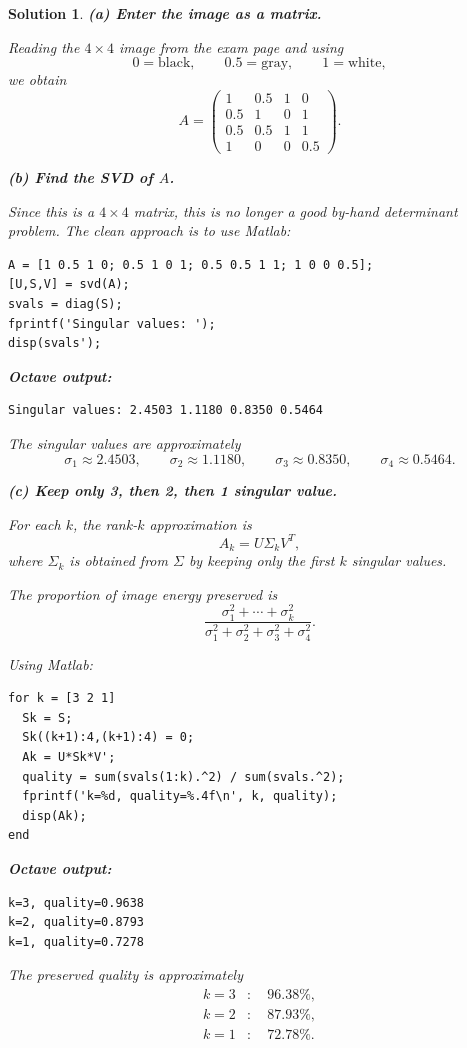 \documentclass[11pt,a4paper]{article}
\theoremstyle{sol}
\newtheorem*{solution}{Solution}
\begin{document}
\begin{solution}
\textbf{(a) Enter the image as a matrix.}

Reading the $4\times4$ image from the exam page and using
\[
0=\text{black},\qquad 0.5=\text{gray},\qquad 1=\text{white},
\]
we obtain
\[
A=
\begin{pmatrix}
1&0.5&1&0\\
0.5&1&0&1\\
0.5&0.5&1&1\\
1&0&0&0.5
\end{pmatrix}.
\]

\textbf{(b) Find the SVD of $A$.}

Since this is a $4\times4$ matrix, this is no longer a good by-hand determinant problem. The clean approach is to use Matlab:
\begin{lstlisting}
A = [1 0.5 1 0; 0.5 1 0 1; 0.5 0.5 1 1; 1 0 0 0.5];
[U,S,V] = svd(A);
svals = diag(S);
fprintf('Singular values: ');
disp(svals');
\end{lstlisting}

\textbf{Octave output:}
\begin{lstlisting}
Singular values: 2.4503 1.1180 0.8350 0.5464
\end{lstlisting}

The singular values are approximately
\[
\sigma_1\approx2.4503,\qquad
\sigma_2\approx1.1180,\qquad
\sigma_3\approx0.8350,\qquad
\sigma_4\approx0.5464.
\]

\textbf{(c) Keep only 3, then 2, then 1 singular value.}

For each $k$, the rank-$k$ approximation is
\[
A_k=U\Sigma_kV^T,
\]
where $\Sigma_k$ is obtained from $\Sigma$ by keeping only the first $k$ singular values.

The proportion of image energy preserved is
\[
\frac{\sigma_1^2+\cdots+\sigma_k^2}{\sigma_1^2+\sigma_2^2+\sigma_3^2+\sigma_4^2}.
\]

Using Matlab:
\begin{lstlisting}
for k = [3 2 1]
  Sk = S;
  Sk((k+1):4,(k+1):4) = 0;
  Ak = U*Sk*V';
  quality = sum(svals(1:k).^2) / sum(svals.^2);
  fprintf('k=%d, quality=%.4f\n', k, quality);
  disp(Ak);
end
\end{lstlisting}

\textbf{Octave output:}
\begin{lstlisting}
k=3, quality=0.9638
k=2, quality=0.8793
k=1, quality=0.7278
\end{lstlisting}

The preserved quality is approximately
\[
\begin{aligned}
k=3&:\quad 96.38\%,\\
k=2&:\quad 87.93\%,\\
k=1&:\quad 72.78\%.
\end{aligned}
\]


\end{solution}
\end{document}
